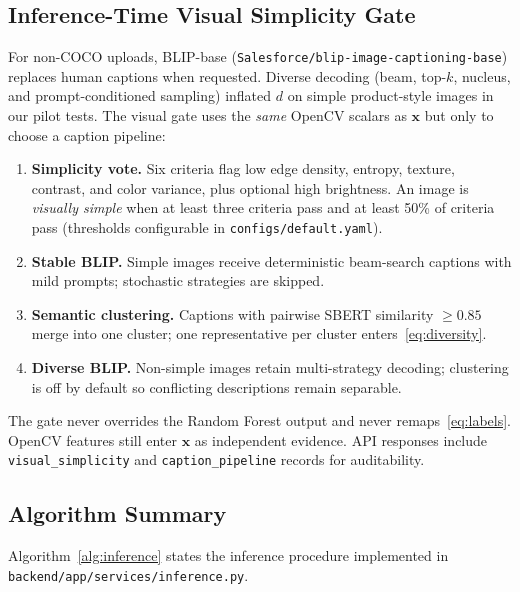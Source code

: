 \documentclass[conference]{IEEEtran}
\begin{document}
\subsection{Inference-Time Visual Simplicity Gate}
\label{sec:gate}
For non-COCO uploads, BLIP-base (\texttt{Salesforce/blip-image-captioning-base}) replaces human captions when requested. Diverse decoding (beam, top-$k$, nucleus, and prompt-conditioned sampling) inflated $d$ on simple product-style images in our pilot tests. The visual gate uses the \emph{same} OpenCV scalars as $\mathbf{x}$ but only to choose a caption pipeline:

\begin{enumerate}
\item \textbf{Simplicity vote.} Six criteria flag low edge density, entropy, texture, contrast, and color variance, plus optional high brightness. An image is \emph{visually simple} when at least three criteria pass and at least 50\% of criteria pass (thresholds configurable in \texttt{configs/default.yaml}).
\item \textbf{Stable BLIP.} Simple images receive deterministic beam-search captions with mild prompts; stochastic strategies are skipped.
\item \textbf{Semantic clustering.} Captions with pairwise SBERT similarity $\ge 0.85$ merge into one cluster; one representative per cluster enters~\eqref{eq:diversity}.
\item \textbf{Diverse BLIP.} Non-simple images retain multi-strategy decoding; clustering is off by default so conflicting descriptions remain separable.
\end{enumerate}

The gate never overrides the Random Forest output and never remaps~\eqref{eq:labels}. OpenCV features still enter $\mathbf{x}$ as independent evidence. API responses include \texttt{visual\_simplicity} and \texttt{caption\_pipeline} records for auditability.

\subsection{Algorithm Summary}
Algorithm~\ref{alg:inference} states the inference procedure implemented in \texttt{backend/app/services/inference.py}.
\end{document}
